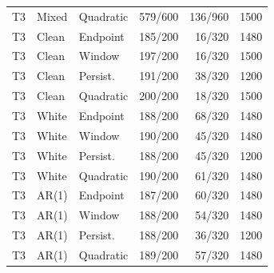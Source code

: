 \documentclass[10pt]{article}
\begin{document}
\begin{longtable}{lllrrr}
T3 & Mixed & Quadratic & 579/600 & 136/960 & 1500 \\
T3 & Clean & Endpoint & 185/200 & 16/320 & 1480 \\
T3 & Clean & Window & 197/200 & 16/320 & 1500 \\
T3 & Clean & Persist. & 191/200 & 38/320 & 1200 \\
T3 & Clean & Quadratic & 200/200 & 18/320 & 1500 \\
T3 & White & Endpoint & 188/200 & 68/320 & 1480 \\
T3 & White & Window & 190/200 & 45/320 & 1480 \\
T3 & White & Persist. & 188/200 & 45/320 & 1200 \\
T3 & White & Quadratic & 190/200 & 61/320 & 1480 \\
T3 & AR(1) & Endpoint & 187/200 & 60/320 & 1480 \\
T3 & AR(1) & Window & 188/200 & 54/320 & 1480 \\
T3 & AR(1) & Persist. & 188/200 & 36/320 & 1200 \\
T3 & AR(1) & Quadratic & 189/200 & 57/320 & 1480 \\
\bottomrule\end{longtable}\endgroup
\begingroup\small\setlength{\tabcolsep}{3.8pt}
\end{document}
